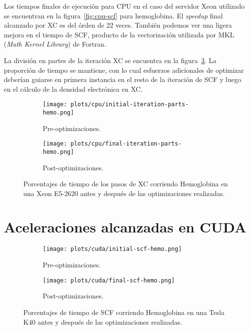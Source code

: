 Los tiempos finales de ejecuci\'on para CPU en el caso del servidor Xeon utilizado se encuentran
en la figura~\ref{fig:cpu-scf} para hemoglobina. El \textit{speedup} final alcanzado por XC es del
\'orden de 22 veces. Tambi\'en podemos ver una ligera mejora en el tiempo de SCF,
producto de la vectorizaci\'on utilizada por MKL (\textit{Math Kernel Library}) de
Fortran.

La divisi\'on en partes de la iteraci\'on XC se encuentra en la figura~\ref{fig:cpu-parts}. La
proporci\'on de tiempo se mantiene, con lo cual esfuerzos adicionales de optimizar deber\'ian
guiarse en primera instancia en el resto de la iteraci\'on de SCF y luego en el c\'alculo de
la densidad electr\'onica en XC.

\begin{figure}[htbp]
\centering
\begin{subfigure}[b]{\plotwidthtres}
   \texttt{[image: plots/cpu/initial-iteration-parts-hemo.png]}
   \caption{Pre-optimizaciones.}
   \label{fig:initial-cuda-parts}
 \end{subfigure}
 \begin{subfigure}[b]{\plotwidthtres}
   \texttt{[image: plots/cpu/final-iteration-parts-hemo.png]}
   \caption{Post-optimizaciones.}
   \label{fig:final-cuda-parts}
 \end{subfigure}
 \caption{Porcentajes de tiempo de los pasos de XC corriendo Hemoglobina en una Xeon E5-2620 antes y despu\'es de
 las optimizaciones realizadas.}
 \label{fig:cpu-parts}
\end{figure}

\section{Aceleraciones alcanzadas en CUDA}
\label{resultados-cuda}

\begin{figure}[htbp]
\centering
\begin{subfigure}[b]{\plotwidthtres}
   \texttt{[image: plots/cuda/initial-scf-hemo.png]}
   \caption{Pre-optimizaciones.}
   \label{fig:initial-cuda-scf}
 \end{subfigure}
 \begin{subfigure}[b]{\plotwidthtres}
   \texttt{[image: plots/cuda/final-scf-hemo.png]}
   \caption{Post-optimizaciones.}
   \label{fig:final-cuda-scf}
 \end{subfigure}
 \caption{Porcentajes de tiempo de SCF corriendo Hemoglobina en una Tesla K40 antes y despu\'es de
 las optimizaciones realizadas.}
 \label{fig:cuda-scf}
\end{figure}

